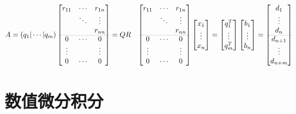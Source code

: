 \documentclass[twocolumn]{article}
\begin{document}
\begin{align*}
    A=(q_1|\cdots|q_m)
    \begin{bmatrix}
        r_{11} & \cdots & r_{1n} \\
               & \ddots & \vdots \\
               &        & r_{nn} \\
        \cdashline{1-3}[0.8pt/2pt]
        0      & \cdots & 0      \\
        \vdots &        & \vdots \\
        0      & \cdots & 0
    \end{bmatrix}
     & =QR
     &
    \begin{bmatrix}
        r_{11} & \cdots & r_{1n} \\
               & \ddots & \vdots \\
               &        & r_{nn} \\
        \cdashline{1-3}[0.8pt/2pt]
        0      & \cdots & 0      \\
        \vdots &        & \vdots \\
        0      & \cdots & 0
    \end{bmatrix}
    \begin{bmatrix}
        x_1    \\
        \vdots \\
        x_n
    \end{bmatrix}
     & =
    \begin{bmatrix}
        q_1^T  \\
        \vdots \\
        q_m^T
    \end{bmatrix}
    \begin{bmatrix}
        b_1    \\
        \vdots \\
        b_n
    \end{bmatrix}
    =
    \begin{bmatrix}
        d_1     \\
        \vdots  \\
        d_n     \\
        \cdashline{1-1}[0.8pt/2pt]
        d_{n+1} \\
        \vdots  \\
        d_{n+m}
    \end{bmatrix}
\end{align*}

\section{数值微分积分}
\end{document}
